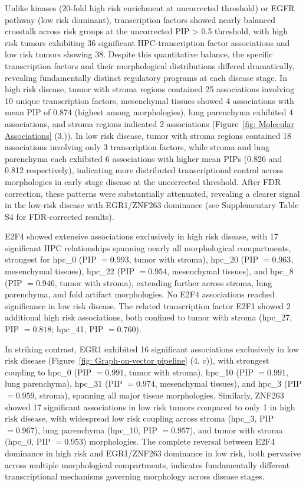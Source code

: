 \documentclass[pdflatex,article,12pt]{article}
\begin{document}
Unlike kinases (20-fold high risk enrichment at uncorrected threshold) or EGFR pathway (low risk dominant), transcription factors showed nearly balanced crosstalk across risk groups at the uncorrected PIP > 0.5 threshold, with high risk tumors exhibiting 36 significant HPC-transcription factor associations and low risk tumors showing 38. Despite this quantitative balance, the specific transcription factors and their morphological distributions differed dramatically, revealing fundamentally distinct regulatory programs at each disease stage. In high risk disease, tumor with stroma regions contained 25 associations involving 10 unique transcription factors, mesenchymal tissues showed 4 associations with mean PIP of 0.874 (highest among morphologies), lung parenchyma exhibited 4 associations, and stroma regions indicated 2 associations (Figure~\ref{fig: Molecular Associations} (3.)). In low risk disease, tumor with stroma regions contained 18 associations involving only 3 transcription factors, while stroma and lung parenchyma each exhibited 6 associations with higher mean PIPs (0.826 and 0.812 respectively), indicating more distributed transcriptional control across morphologies in early stage disease at the uncorrected threshold. After FDR correction, these patterns were substantially attenuated, revealing a clearer signal in the low-risk disease with EGR1/ZNF263 dominance (see Supplementary Table S4 for FDR-corrected results).

E2F4 showed extensive associations exclusively in high risk disease, with 17 significant HPC relationships spanning nearly all morphological compartments, strongest for hpc\_0 (PIP $= 0.993$, tumor with stroma), hpc\_20 (PIP $= 0.963$, mesenchymal tissues), hpc\_22 (PIP $= 0.954$, mesenchymal tissues), and hpc\_8 (PIP $= 0.946$, tumor with stroma), extending further across stroma, lung parenchyma, and fold artifact morphologies. No E2F4 associations reached significance in low risk disease. The related transcription factor E2F1 showed 2 additional high risk associations, both confined to tumor with stroma (hpc\_27, PIP $= 0.818$; hpc\_41, PIP $= 0.760$).

In striking contrast, EGR1 exhibited 16 significant associations exclusively in low risk disease (Figure~\ref{fig: Graph-on-vector pipeline} (4. c)), with strongest coupling to hpc\_0 (PIP $= 0.991$, tumor with stroma), hpc\_10 (PIP $= 0.991$, lung parenchyma), hpc\_31 (PIP $= 0.974$, mesenchymal tissues), and hpc\_3 (PIP $= 0.959$, stroma), spanning all major tissue morphologies. Similarly, ZNF263 showed 17 significant associations in low risk tumors compared to only 1 in high risk disease, with widespread low risk coupling across stroma (hpc\_3, PIP $= 0.967$), lung parenchyma (hpc\_10, PIP $= 0.957$), and tumor with stroma (hpc\_0, PIP $= 0.953$) morphologies. The complete reversal between E2F4 dominance in high risk and EGR1/ZNF263 dominance in low risk, both pervasive across multiple morphological compartments, indicates fundamentally different transcriptional mechanisms governing morphology across disease stages.
\end{document}

